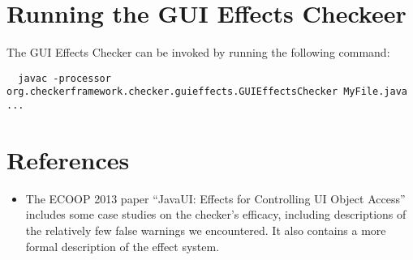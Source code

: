 \section{Running the GUI Effects Checkeer\label{gui-running}}

The GUI Effects Checker can be invoked by running the following command:
\begin{Verbatim}
  javac -processor org.checkerframework.checker.guieffects.GUIEffectsChecker MyFile.java ...
\end{Verbatim}


\section{References\label{guieffects-references}}

\begin{itemize}
\item The ECOOP 2013 paper ``JavaUI: Effects for Controlling UI Object Access''
    includes some case
    studies on the checker's efficacy, including descriptions of the relatively few false warnings
    we encountered.
    It also contains a more formal description of the effect system.\\

\end{itemize}


